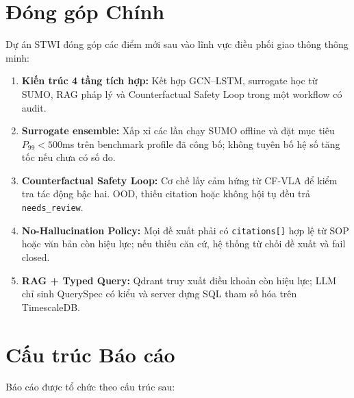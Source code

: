 \section{Đóng góp Chính}

Dự án STWI đóng góp các điểm mới sau vào lĩnh vực điều phối giao thông thông minh:

\begin{enumerate}[leftmargin=1.5cm, itemsep=5pt]
  \item \textbf{Kiến trúc 4 tầng tích hợp:} Kết hợp GCN--LSTM, surrogate học từ SUMO, RAG pháp lý và Counterfactual Safety Loop trong một workflow có audit.

  \item \textbf{Surrogate ensemble:} Xấp xỉ các lần chạy SUMO offline và đặt mục tiêu $P_{99}<500$ms trên benchmark profile đã công bố; không tuyên bố hệ số tăng tốc nếu chưa có số đo.

  \item \textbf{Counterfactual Safety Loop:} Cơ chế lấy cảm hứng từ CF-VLA để kiểm tra tác động bậc hai. OOD, thiếu citation hoặc không hội tụ đều trả \texttt{needs\_review}.

  \item \textbf{No-Hallucination Policy:} Mọi đề xuất phải có \texttt{citations[]} hợp lệ từ SOP hoặc văn bản còn hiệu lực; nếu thiếu căn cứ, hệ thống từ chối đề xuất và fail closed.

  \item \textbf{RAG + Typed Query:} Qdrant truy xuất điều khoản còn hiệu lực; LLM chỉ sinh QuerySpec có kiểu và server dựng SQL tham số hóa trên TimescaleDB.
\end{enumerate}

\section{Cấu trúc Báo cáo}

Báo cáo được tổ chức theo cấu trúc sau:

